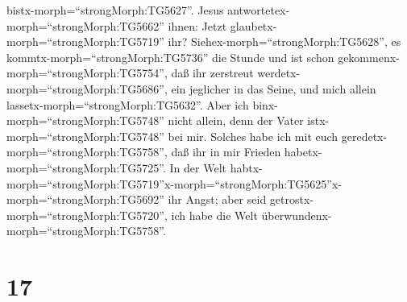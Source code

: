 bistx-morph=``strongMorph:TG5627''.  Jesus
antwortetex-morph=``strongMorph:TG5662'' ihnen: Jetzt
glaubetx-morph=``strongMorph:TG5719'' ihr? 
Siehex-morph=``strongMorph:TG5628'', es
kommtx-morph=``strongMorph:TG5736'' die Stunde und ist schon
gekommenx-morph=``strongMorph:TG5754'', daß ihr zerstreut
werdetx-morph=``strongMorph:TG5686'', ein jeglicher in das Seine, und
mich allein lassetx-morph=``strongMorph:TG5632''. Aber ich
binx-morph=``strongMorph:TG5748'' nicht allein, denn der Vater
istx-morph=``strongMorph:TG5748'' bei mir.  Solches habe
ich mit euch geredetx-morph=``strongMorph:TG5758'', daß ihr in mir
Frieden habetx-morph=``strongMorph:TG5725''. In der Welt
habtx-morph=``strongMorph:TG5719''\textbar x-morph=``strongMorph:TG5625''x-morph=``strongMorph:TG5692''
ihr Angst; aber seid getrostx-morph=``strongMorph:TG5720'', ich habe die
Welt überwundenx-morph=``strongMorph:TG5758''.

\hypertarget{section-16}{%
\section{17}\label{section-16}}

